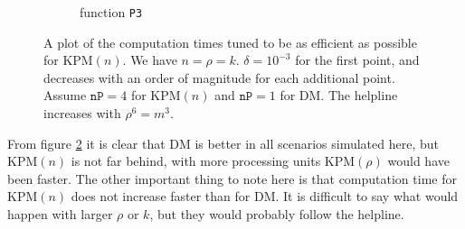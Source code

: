 \begin{figure}[H]
\begin{subfigure}[b]{0.45\textwidth}
                \caption{function \texttt{P3}}
                \label{fig:c2comp2m}
        \end{subfigure}
%        
        \caption{A plot of the computation times tuned to be as efficient as possible for KPM$(n)$. We have $n = \rho = k$. $\delta = 10^{-3}$ for the first point, and decreases with an order of magnitude for each additional point. Assume $\texttt{nP} = 4$ for KPM$(n)$ and $\texttt{nP} = 1$ for DM. The helpline increases with $\rho^6 = m^3$.}\label{fig:comp}
        
\end{figure}
From figure \ref{fig:comp} it is clear that DM is better in all scenarios simulated here, but KPM$(n)$ is not far behind, with more processing units KPM$(\rho)$ would have been faster. The other important thing to note here is that computation time for KPM$(n)$ does not increase faster than for DM. It is difficult to say what would happen with larger $\rho$ or $k$, but they would probably follow the helpline.

